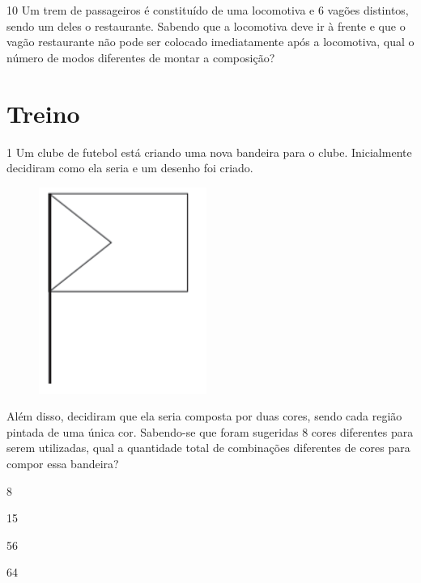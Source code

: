 \begin{emptybox}
\bigskip\bigskip
\end{emptybox}

\num{10} Um trem de passageiros é constituído de uma locomotiva e 6 vagões
distintos, sendo um deles o restaurante. Sabendo que a locomotiva deve ir
à frente e que o vagão restaurante não pode ser colocado imediatamente
após a locomotiva, qual o número de modos diferentes de montar a composição?

\begin{emptybox}
\end{emptybox}

\section*{Treino}

\num{1} Um clube de futebol está criando uma nova bandeira para o clube.
Inicialmente decidiram como ela seria e um desenho foi criado.

\begin{figure}[htpb!]
\centering
\includegraphics[width=.35\textwidth]{./imgs/mat16.png}
\end{figure}

Além disso, decidiram que ela seria composta por duas cores, sendo cada
região pintada de uma única cor. Sabendo-se que foram sugeridas 8 cores
diferentes para serem utilizadas, qual a quantidade total de combinações
diferentes de cores para compor essa bandeira?

\begin{escolha}
\item
  8
\item
  15
\item
  56
\item
  64
\end{escolha}

